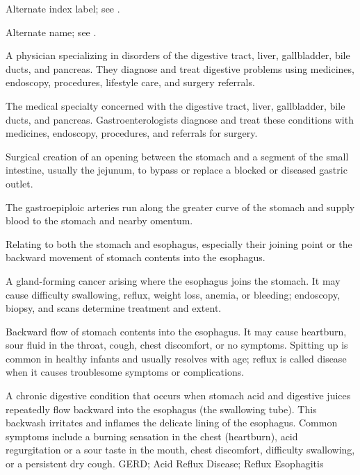  Alternate index label; see .

 Alternate name; see .

 A physician specializing in disorders of the digestive tract, liver, gallbladder, bile ducts, and pancreas. They diagnose and treat digestive problems using medicines, endoscopy, procedures, lifestyle care, and surgery referrals.

 The medical specialty concerned with the digestive tract, liver, gallbladder, bile ducts, and pancreas. Gastroenterologists diagnose and treat these conditions with medicines, endoscopy, procedures, and referrals for surgery.

 Surgical creation of an opening between the stomach and a segment of the small intestine, usually the jejunum, to bypass or replace a blocked or diseased gastric outlet.

 The gastroepiploic arteries run along the greater curve of the stomach and supply blood to the stomach and nearby omentum.

 Relating to both the stomach and esophagus, especially their joining point or the backward movement of stomach contents into the esophagus.

 A gland-forming cancer arising where the esophagus joins the stomach. It may cause difficulty swallowing, reflux, weight loss, anemia, or bleeding; endoscopy, biopsy, and scans determine treatment and extent.

 Backward flow of stomach contents into the esophagus. It may cause heartburn, sour fluid in the throat, cough, chest discomfort, or no symptoms. Spitting up is common in healthy infants and usually resolves with age; reflux is called disease when it causes troublesome symptoms or complications.

 A chronic digestive condition that occurs when stomach acid and digestive juices repeatedly flow backward into the esophagus (the swallowing tube). This backwash irritates and inflames the delicate lining of the esophagus. Common symptoms include a burning sensation in the chest (heartburn), acid regurgitation or a sour taste in the mouth, chest discomfort, difficulty swallowing, or a persistent dry cough.
\synonyms
GERD; Acid Reflux Disease; Reflux Esophagitis

